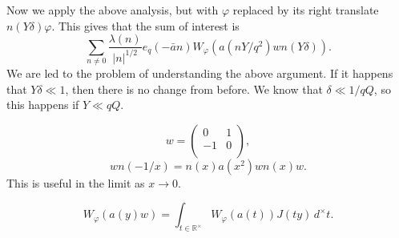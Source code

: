 \documentclass[reqno]{amsart} 
\begin{document}
Now we apply the above analysis, but with $\varphi$ replaced by its right translate $n(Y \delta) \varphi$.  This gives that the sum of interest is
\begin{equation*}
  \sum_{n \neq 0}
  \frac{\lambda(n)}{\lvert n \rvert^{1/2}}
  e_q(-\bar{a} n)
  W_{\varphi}(a(n Y / q^2) w n(Y \delta)).
\end{equation*}
We are led to the problem of understanding the above argument.  If it happens that $Y \delta \ll 1$, then there is no change from before.  We know that $\delta \ll 1/ q Q$, so this happens if $Y \ll q Q$.

\begin{equation*}
  w =
  \begin{pmatrix}
    0    & 1 \\
    -1 & 0 \\
  \end{pmatrix},
\end{equation*}
\begin{equation*}
  w n(- 1/x) = n(x) a(x^2) w n(x) w.
\end{equation*}
This is useful in the limit as $x \rightarrow 0$.

\begin{equation*}
  W_{\varphi} (a(y) w)
  =
  \int_{t \in \mathbb{R}^\times}
  W_\varphi(a(t)) J(t y) \,d^\times t.
\end{equation*}

{} 
\end{document}
